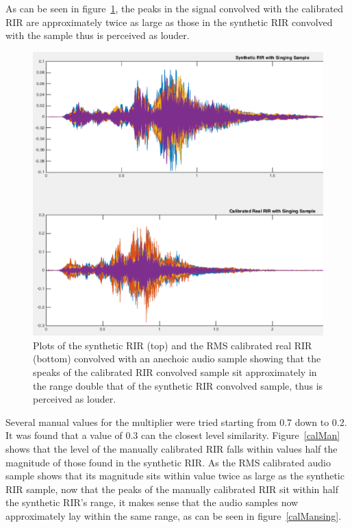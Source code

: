 \documentclass[../../main.tex]{subfiles}
\begin{document}
		As can be seen in figure~\ref{calRMSsing}, the peaks in the signal convolved with the calibrated RIR are approximately twice as large as those in the synthetic RIR convolved with the sample thus is perceived as louder.

		\begin{figure}[H]
			\begin{center}
				\includegraphics[scale = 0.3]{Sections/Implementation/RealRIRs/images/calibration/CalRMS_Sing_edit.png} 
				\caption{Plots of the synthetic \ac{RIR} (top) and the RMS calibrated real \ac{RIR} (bottom) convolved with an anechoic audio sample showing that the speaks of the calibrated \ac{RIR} convolved sample sit approximately in the range double that of the synthetic \ac{RIR} convolved sample, thus is perceived as louder.}
				\label{calRMSsing}
			\end{center}
		\end{figure}

		Several manual values for the multiplier were tried starting from 0.7 down to 0.2. It was found that a value of 0.3 can the closest level similarity. Figure~\ref{calMan} shows that the level of the manually calibrated RIR falls within values half the magnitude of those found in the synthetic RIR. As the RMS calibrated audio sample shows that its magnitude sits within value twice as large as the synthetic \ac{RIR} sample, now that the peaks of the manually calibrated \ac{RIR} sit within half the synthetic \ac{RIR}'s range, it makes sense that the audio samples now approximately lay within the same range, as can be seen in figure~\ref{calMansing}.
\end{document}
